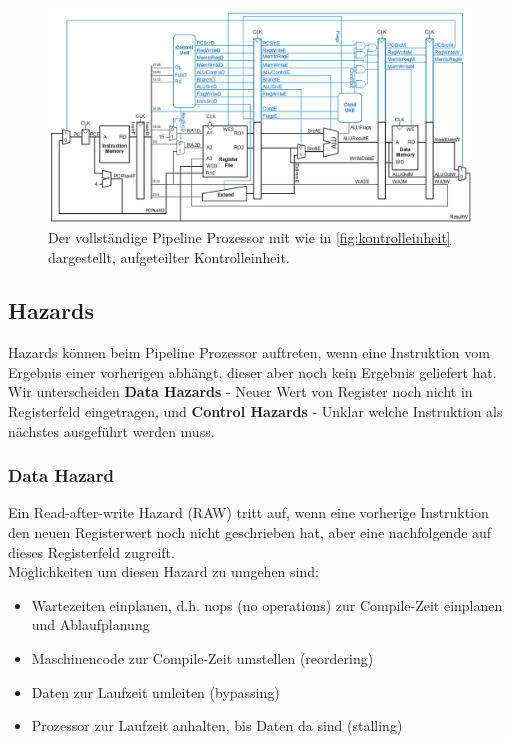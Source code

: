 \documentclass[a4paper,12pt,leqno]{article}
\begin{document}
\begin{figure}[h!]
\centering
\includegraphics[scale=0.5]{Grafiken/PipelineProzessor-vollstaendig.png}
\caption{Der vollständige Pipeline Prozessor mit wie in \ref{fig:kontrolleinheit} dargestellt, aufgeteilter Kontrolleinheit.}
\end{figure}

\subsection{Hazards}
Hazards können beim Pipeline Prozessor auftreten, wenn eine Instruktion vom Ergebnis einer vorherigen abhängt, dieser aber noch kein Ergebnis geliefert hat.\\
Wir unterscheiden \textbf{Data Hazards} - Neuer Wert von Register noch nicht in Registerfeld eingetragen, und \textbf{Control Hazards} - Unklar welche Instruktion als nächstes ausgeführt werden muss.

\subsubsection{Data Hazard}
Ein Read-after-write Hazard (RAW) tritt auf, wenn eine vorherige Instruktion den neuen Registerwert noch nicht geschrieben hat, aber eine nachfolgende auf dieses Registerfeld zugreift.\\

Möglichkeiten um diesen Hazard zu umgehen sind:
\begin{itemize}
\item Wartezeiten einplanen, d.h. nops (no operations) zur Compile-Zeit einplanen und Ablaufplanung
\item Maschinencode zur Compile-Zeit umstellen (reordering)
\item Daten zur Laufzeit umleiten (bypassing)
\item Prozessor zur Laufzeit anhalten, bis Daten da sind (stalling)
\end{itemize}
\end{document}
